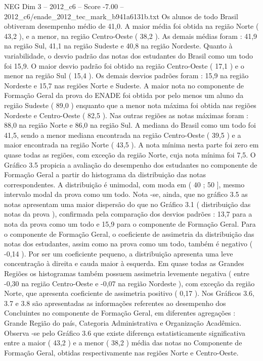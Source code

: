 \begin{textsample}{NEG Dim 3 – 2012\_c6 – Score -7.00 – 2012\_c6/enade\_2012\_tec\_mark\_b941a6131b.txt}
Os alunos de todo Brasil obtiveram desempenho médio de 41,0.
A maior média foi obtida na região Norte ( 43,2 ), e a menor, na região Centro-Oeste ( 38,2 ).
As demais médias foram : 41,9 na região Sul, 41,1 na região Sudeste e 40,8 na região Nordeste.
Quanto à variabilidade, o desvio padrão das notas dos estudantes do Brasil como um todo foi 15,9.
O maior desvio padrão foi obtido na região Centro-Oeste ( 17,1 ) e o menor na região Sul ( 15,4 ).
Os demais desvios padrões foram : 15,9 na região Nordeste e 15,7 nas regiões Norte e Sudeste.
A maior nota no componente de Formação Geral da prova do ENADE foi obtida por pelo menos um aluno da região Sudeste ( 89,0 ) enquanto que a menor nota máxima foi obtida nas regiões Nordeste e Centro-Oeste ( 82,5 ).
Nas outras regiões as notas máximas foram : 88,0 na região Norte e 86,0 na região Sul.
A mediana do Brasil como um todo foi 41,5, sendo a menor mediana encontrada na região Centro-Oeste ( 39,5 ) e a maior encontrada na região Norte ( 43,5 ).
A nota mínima nesta parte foi zero em quase todas as regiões, com exceção da região Norte, cuja nota mínima foi 7,5.
O Gráfico 3.5 propicia a avaliação do desempenho dos estudantes no componente de Formação Geral a partir do histograma da distribuição das notas correspondentes.
A distribuição é unimodal, com moda em ( 40 ; 50 ], mesmo intervalo modal da prova como um todo.
Nota -se, ainda, que no gráfico 3.5 as notas apresentam uma maior dispersão do que no Gráfico 3.1 ( distribuição das notas da prova ), confirmada pela comparação dos desvios padrões : 13,7 para a nota da prova como um todo e 15,9 para o componente de Formação Geral.
Para o componente de Formação Geral, o coeficiente de assimetria da distribuição das notas dos estudantes, assim como na prova como um todo, também é negativo ( -0,14 ).
Por ser um coeficiente pequeno, a distribuição apresenta uma leve concentração à direita e cauda maior à esquerda.
Em quase todas as Grandes Regiões os histogramas também possuem assimetria levemente negativa ( entre -0,30 na região Centro-Oeste e -0,07 na região Nordeste ), com exceção da região Norte, que apresenta coeficiente de assimetria positivo ( 0,17 ).
Nos Gráficos 3.6, 3.7 e 3.8 são apresentadas as informações referentes ao desempenho dos Concluintes no componente de Formação Geral, em diferentes agregações : Grande Região do país, Categoria Administrativa e Organização Acadêmica.
Observa -se pelo Gráfico 3.6 que existe diferença estatisticamente significativa entre a maior ( 43,2 ) e a menor ( 38,2 ) média das notas no Componente de Formação Geral, obtidas respectivamente nas regiões Norte e Centro-Oeste.

\end{textsample}
